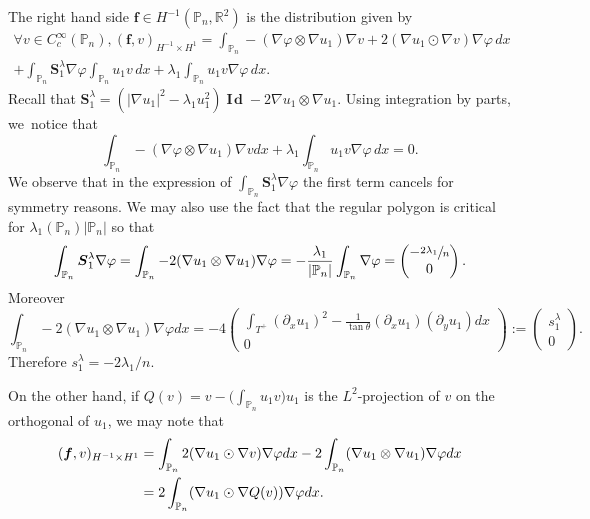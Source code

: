 \documentclass[11pt]{article}
\numberwithin{equation}{section}\newtheorem*{jepEnonce}{\jepEnonceTitle}\newenvironment{enonce*}[1]{\def\jepEnonceTitle{#1}\jepEnonce}{\endjepEnonce}\newtheorem*{conj*}{Conjecture}
\theoremstyle{plain}
\theoremstyle{definition}
\newcommand{\bo}[1]{{\boldsymbol#1}}
\newcommand{\Id}{\operatorname{{\bo I\!\bo d}}}
\let\Bbb\mathbb
\def\R{\mathbb{R}}
\def\Pp{{\mathbb{P}_n}}
\let\jepOriginalSfrac\sfrac
\renewcommand{\sfrac}[2]{{\jepOriginalSfrac{#1}{#2}}}
\begin{document}
The right hand side $\bo f \in H^{-1} (\Pp, \R^2)$ is the distribution given by
\vspace*{-5pt}
\begin{multline*}
\forall v \in C_c^\infty (\Pp), (\bo f,v)_{H^{-1}\times H^1} = \int_{\Pp} -(\nabla \varphi\otimes \nabla u_1)\nabla v+2(\nabla u_1 \odot \nabla v)\nabla \varphi \, dx\\
+\int_{\Pp} \bo S_1^\lambda \nabla \varphi \int_{\Pp} u_1v\, dx + \lambda_1\int_{\Pp} u_1v \nabla \varphi\, dx.
\end{multline*}
Recall that $\bo S_1^\lambda = (|\nabla u_1|^2 -\lambda_1 u_1^2)\Id -2\nabla u_1 \otimes \nabla u_1$. Using integration by parts, we~notice that
\[
\int_{\Pp} -(\nabla \varphi\otimes \nabla u_1)\nabla vdx+ \lambda_1 \int_{\Pp} u_1v \nabla \varphi\, dx=0.
\]
We observe that
in the expression of $\int_{\Pp} \bo S_1^\lambda \nabla \varphi $ the first term cancels for symmetry reasons. We may also use the fact that the regular polygon is critical for $\lambda_1(\Pp)|\Pp|$ so that
\[
\int_{\Pp} \bo S_1^\lambda \nabla \varphi = \int_{\Pp} -2(\nabla u_1 \otimes \nabla u_1) \nabla \varphi = -\frac{\lambda_1}{|\Pp|} \int_{\Pp} \nabla \varphi = \begin{pmatrix}
-\sfrac{2\lambda_1}{n} \\ 0
\end{pmatrix}.
\]
Moreover
\[
\int_{\Pp}-2 (\nabla u_1 \otimes \nabla u_1) \nabla \varphi dx = -4\begin{pmatrix} \displaystyle \int_{T^+ } (\partial_x u_1)^2 - \frac{1}{\tan \theta} (\partial_x u_1)(\partial_y u_1)dx\\0 \end{pmatrix}:= \begin{pmatrix} s_1^\lambda \\ 0\end{pmatrix}.
\]
Therefore $s_1^\lambda = -2\lambda_1/n$.

On the other hand, if $Q(v) = v-\bigl(\int_{\Pp} u_1v \bigr)u_1$ is the $L^2$-projection of $v$ on the orthogonal of $u_1$, we may note that
\begin{align}\label{eq:f-with-Q}
(\bo f,v)_{H^{-1}\times H^1} & = \int_{\Bbb P_n}2(\nabla u_1\odot \nabla v)\nabla \varphi dx - 2 \int_{\Bbb P_n} (\nabla u_1\otimes \nabla u_1)\nabla \varphi dx \\
& = 2\int_{\Bbb P_n} (\nabla u_1 \odot \nabla Q(v))\nabla \varphi dx. \notag
\end{align}
\end{document}
